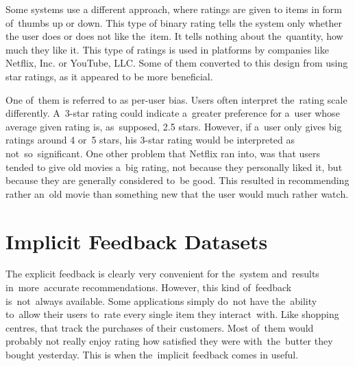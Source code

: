 Some systems use a different approach, where ratings are given to items in form of~thumbs up or down. This type of binary rating tells the system only whether the user does or does not like the~item. It tells nothing about the~quantity, how much they like it. This type of ratings is used in platforms by companies like Netflix, Inc. or YouTube, LLC. Some of them converted to this design from using star ratings, as it appeared to be more beneficial. 

One of~them is referred to as per-user bias. Users often interpret the~rating scale differently. A~3-star rating could indicate a~greater preference for a~user whose average given rating is, as~supposed, 2.5 stars. However, if a~user only gives big ratings around 4 or~5 stars, his 3-star rating would be interpreted as not~so~significant. One other problem that Netflix ran into, was that users tended to give old movies a~big rating, not because they personally liked it, but because they are generally considered to~be good. This resulted in recommending rather an~old movie than something new that the user would much rather watch.

\section{Implicit Feedback Datasets} \label{implicit_datasets}
The explicit feedback is clearly very convenient for the~system and~results in~more~accurate recommendations. However, this kind of~feedback is~not~always available. Some applications simply do~not have the~ability to~allow their users to~rate every single item they interact~with. Like shopping centres, that track the purchases of their customers. Most of~them would probably not really enjoy rating how satisfied they were with~the~butter they bought yesterday. This is when the~implicit feedback comes in useful.

